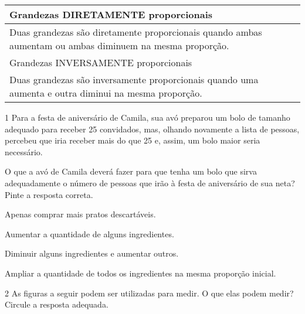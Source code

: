 {{\begin{longtable}[]{@{}l@{}}
\toprule
Grandezas DIRETAMENTE proporcionais\tabularnewline
\midrule
\endhead
Duas grandezas são diretamente proporcionais quando ambas aumentam ou
ambas diminuem na mesma proporção.\tabularnewline
Grandezas INVERSAMENTE proporcionais\tabularnewline
Duas grandezas são inversamente proporcionais quando uma aumenta e outra
diminui na mesma proporção.\tabularnewline
\bottomrule
\end{longtable}
}


\num{1} Para a festa de aniversário de Camila, sua avó preparou um bolo de tamanho adequado para receber 25 convidados, mas, olhando novamente a
lista de pessoas, percebeu que iria receber mais do que 25 e, assim, um bolo maior seria necessário.

O que a avó de Camila deverá fazer para que tenha um bolo que sirva
adequadamente o número de pessoas que irão à festa de aniversário de sua neta? Pinte a resposta correta.


\begin{escolha}
\item
  Apenas comprar mais pratos descartáveis.
\item
  Aumentar a quantidade de alguns ingredientes.
\item
  Diminuir alguns ingredientes e aumentar outros.
\item
  Ampliar a quantidade de todos os ingredientes na mesma proporção inicial.
\end{escolha}


\num{2} As figuras a seguir podem ser utilizadas para medir. O que elas podem medir? Circule a resposta adequada.

%
%
%

}
